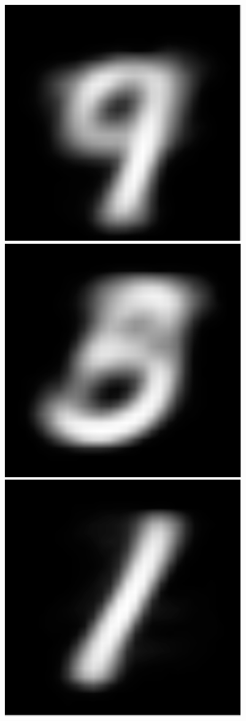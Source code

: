 \documentclass[submit]{harvardml}
\begin{document}
\begin{figure}[h]
	\includegraphics[scale=0.1]{./m1/0}
	\includegraphics[scale=0.1]{./m1/1}
	\includegraphics[scale=0.1]{./m1/2}

\end{figure}
\end{document}

